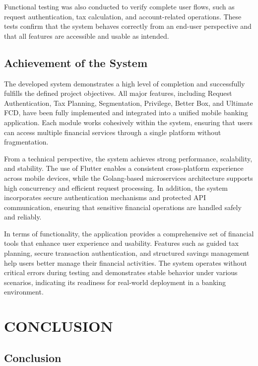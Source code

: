 \documentclass[12pt,oneside,openright,a4paper]{cpe-english-project}
\begin{document}
Functional testing was also conducted to verify complete user flows, such as request authentication, tax calculation, and account-related operations. These tests confirm that the system behaves correctly from an end-user perspective and that all features are accessible and usable as intended.

\section{Achievement of the System}

The developed system demonstrates a high level of completion and successfully fulfills the defined project objectives. All major features, including Request Authentication, Tax Planning, Segmentation, Privilege, Better Box, and Ultimate FCD, have been fully implemented and integrated into a unified mobile banking application. Each module works cohesively within the system, ensuring that users can access multiple financial services through a single platform without fragmentation.

From a technical perspective, the system achieves strong performance, scalability, and stability. The use of Flutter enables a consistent cross-platform experience across mobile devices, while the Golang-based microservices architecture supports high concurrency and efficient request processing. In addition, the system incorporates secure authentication mechanisms and protected API communication, ensuring that sensitive financial operations are handled safely and reliably.

In terms of functionality, the application provides a comprehensive set of financial tools that enhance user experience and usability. Features such as guided tax planning, secure transaction authentication, and structured savings management help users better manage their financial activities. The system operates without critical errors during testing and demonstrates stable behavior under various scenarios, indicating its readiness for real-world deployment in a banking environment.

\hfill\break


\chapter{CONCLUSION}

\section{Conclusion}
\end{document}
